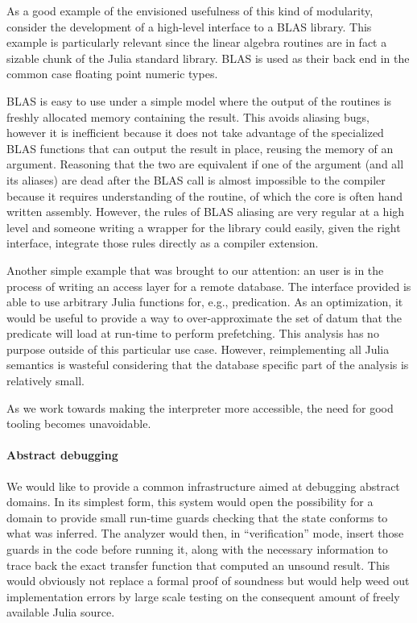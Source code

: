 \documentclass[11pt]{article}
\begin{document}
As a good example of the envisioned usefulness of this kind of modularity, consider the development of a high-level interface to a BLAS library.
This example is particularly relevant since the linear algebra routines are in fact a sizable chunk of the Julia standard library. BLAS is used as their back end in the common case floating point numeric types.

BLAS is easy to use under a simple model where the output of the routines is freshly allocated memory containing the result. This avoids aliasing bugs, however it is inefficient because it does not take advantage of the specialized BLAS functions that can output the result in place, reusing the memory of an argument. Reasoning that the two are equivalent if one of the argument (and all its aliases) are dead after the BLAS call is almost impossible to the compiler because it requires understanding of the routine, of which the core is often hand written assembly.
However, the rules of BLAS aliasing are very regular at a high level and someone writing a wrapper for the library could easily, given the right interface, integrate those rules directly as a compiler extension.

Another simple example that was brought to our attention: an user is in the process of writing an access layer for a remote database.
The interface provided is able to use arbitrary Julia functions for, e.g., predication.
As an optimization, it would be useful to provide a way to over-approximate the set of datum that the predicate will load at run-time to perform prefetching.
This analysis has no purpose outside of this particular use case.
However, reimplementing all Julia semantics is wasteful considering that the database specific part of the analysis is relatively small.

As we work towards making the interpreter more accessible, the need for good tooling becomes unavoidable.

\paragraph{Abstract debugging} We would like to provide a common infrastructure aimed at debugging abstract domains.
In its simplest form, this system would open the possibility for a domain to provide small run-time guards checking that the state conforms to what was inferred.
The analyzer would then, in ``verification'' mode, insert those guards in the code before running it, along with the necessary information to trace back the exact transfer function that computed an unsound result.
This would obviously not replace a formal proof of soundness but would help weed out implementation errors by large scale testing on the consequent amount of freely available Julia source.
\end{document}
